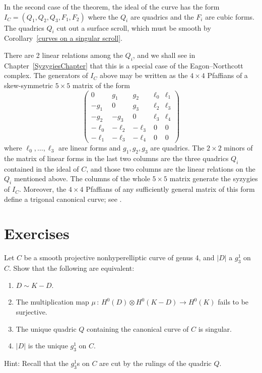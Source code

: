 \begin{fact}
In the second case of the theorem, the ideal of the curve has the form $I_C = (Q_1, Q_2, Q_3, F_1, F_2)$
where the $Q_i$ are quadrics and the $F_i$ are cubic forms.
The quadrics $Q_i$ cut out a surface
scroll,
%
which
must be smooth by Corollary~\ref{curves on a singular scroll}.

There are 2 linear relations among the
$Q_i$, and we shall see in Chapter~\ref{SyzygiesChapter}
that this is a special case of the
Eagon--Northcott complex.
%
The generators of $I_C$ above may be written as the $4\times 4$
Pfaffians
%
of a skew-symmetric $5\times 5$ matrix of the form
$$
\begin{pmatrix}
0&g_1&g_2&\ell_0&\ell_1\\
-g_1&0&g_3&\ell_2&\ell_3\\
-g_2&-g_3&0 &\ell_3&\ell_4\\
-\ell_0&-\ell_2&-\ell_3&0&0\\
-\ell_1&-\ell_3&-\ell_4&0&0
\end{pmatrix}
$$
where $\ell_0,\dots,\ell_3$ are linear forms and $g_1, g_2, g_3$ are quadrics. The
 $2\times 2$
minors of the matrix of linear forms in the last two columns are the three quadrics $Q_i$ contained in the ideal
of $C$, and those two columns are the linear relations on the $Q_i$ mentioned above.
The columns of the whole $5\times 5$ matrix generate the syzygies of $I_C$. Moreover, the
$4\times 4$ Pfaffians of any sufficiently general matrix of this form define a
trigonal canonical curve;
%
see \cite{MR453723}.
%
\end{fact}

\section{Exercises}

\begin{exercise} \label{ex7.1}
Let $C$ be a smooth projective nonhyperelliptic
curve of genus 4,
%
and $|D|$ a $g^1_3$ on $C$. Show that the following are equivalent:
\begin{enumerate}
\item $D \sim K-D$.
\item The multiplication map $\mu \,{:}\, H^0(D) \otimes H^0(K-D) \to H^0(K)$ fails to be sur\-jec\-tive.
\item The unique quadric $Q$ containing the canonical curve of $C$ is singular.
\item $|D|$ is the unique $g^1_3$ on $C$.
\end{enumerate}

Hint: Recall that the $g^1_3$s on $C$ are cut by the rulings of the quadric $Q$.
\end{exercise}

